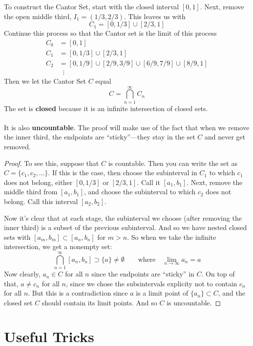 \documentclass[12pt]{article}
\theoremstyle{plain}
\theoremstyle{definition}
\theoremstyle{remark}
\begin{document}
To construct the Cantor Set, start with the closed interval $[0,1]$. Next, remove the open middle third, $I_1 = (1/3, 2/3)$. This leaves us with 
    \[ C_1 = [0, 1/3] \cup [2/3, 1] \]
Continue this process so that the Cantor set is the limit of this process
\begin{align*}
    C_0 &= [0,1] \\
    C_1 &= [0,1/3] \cup [2/3, 1] \\
    C_2 &= [0,1/9] \cup [2/9, 3/9]  \cup [6/9, 7/9] \cup [8/9, 1]
        \\
    &\;\;\vdots 
\end{align*}
Then we let the Cantor Set $C$ equal
    \[ C = \bigcap^\infty_{n=1} C_n \]
    The set is \textbf{closed} because it is an infinite intersection of closed sets.
\\
\\
It is also \textbf{uncountable}. The proof will make use of the fact that when we remove the inner third, the endpoints are ``sticky''---they stay in the set $C$ and never get removed.
\begin{proof}
To see this, suppose that $C$ is countable. Then you can write the set as $C = \{c_1, c_2, \ldots\}$. If this is the case, then choose the subinterval in $C_1$ to which $c_1$ does not belong, either $[0,1/3]$ or $[2/3,1]$. Call it $[a_1, b_1]$. Next, remove the middle third from $[a_1, b_1]$, and choose the subinterval to which $c_2$ does not belong. Call this interval $[a_2, b_2]$. 

Now it's clear that at each stage, the subinterval we choose (after removing the inner third) is a subset of the previous subinterval. And so we have nested closed sets with $[a_m, b_m] \subset [a_n, b_n]$ for $m>n$. So when we take the infinite intersection, we get a nonempty set:
\[ 
    \bigcap^\infty_{n=1} [a_n, b_n] \supset \{a\} \neq 
    \emptyset\qquad \text{where} \quad 
    \lim_{n\rightarrow\infty} a_n = a
\]
Now clearly, $a_n\in C$ for all $n$ since the endpoints are ``sticky'' in $C$.  On top of that, $a\neq c_n$ for all $n$, since we chose the subsintervals explicity not to contain $c_n$ for all $n$.  But this is a contradiction since $a$ is a limit point of $\{a_n\}\subset C$, and the closed set $C$ should contain its limit points. And so $C$ is uncountable.
\end{proof}


\newpage
\section{Useful Tricks}
\end{document}
